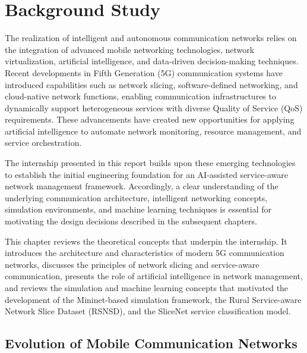 \documentclass[12pt,a4paper]{report}
\begin{document}
	
	
	
	\chapter{Background Study}
	\label{chap:background}
	
	The realization of intelligent and autonomous communication networks relies on the integration of advanced mobile networking technologies, network virtualization, artificial intelligence, and data-driven decision-making techniques. Recent developments in Fifth Generation (5G) communication systems have introduced capabilities such as network slicing, software-defined networking, and cloud-native network functions, enabling communication infrastructures to dynamically support heterogeneous services with diverse Quality of Service (QoS) requirements. These advancements have created new opportunities for applying artificial intelligence to automate network monitoring, resource management, and service orchestration.
	
	The internship presented in this report builds upon these emerging technologies to establish the initial engineering foundation for an AI-assisted service-aware network management framework. Accordingly, a clear understanding of the underlying communication architecture, intelligent networking concepts, simulation environments, and machine learning techniques is essential for motivating the design decisions described in the subsequent chapters.
	
	This chapter reviews the theoretical concepts that underpin the internship. It introduces the architecture and characteristics of modern 5G communication networks, discusses the principles of network slicing and service-aware communication, presents the role of artificial intelligence in network management, and reviews the simulation and machine learning concepts that motivated the development of the Mininet-based simulation framework, the Rural Service-aware Network Slice Dataset (RSNSD), and the SliceNet service classification model.
	
	
	\section{Evolution of Mobile Communication Networks}
	\label{sec:evolution}
	
\end{document}
